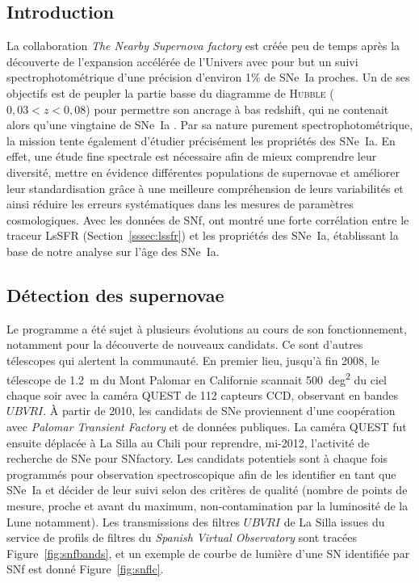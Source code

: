 \documentclass[../main/main.tex]{subfiles}
\begin{document}
\subsection{Introduction}\label{ssec:snfintro}

La collaboration \textit{The Nearby Supernova factory}
\citep[SNfactory,][]{aldering2002} est créée peu de temps après la découverte de
l'expansion accélérée de l'Univers \citep{riess1998, perlmutter1999} avec pour
but un suivi spectrophotométrique d'une précision d'environ 1\% de SNe~Ia
proches. Un de ses objectifs est de peupler la partie basse du diagramme de
\textsc{Hubble} ($0,03 < z < 0,08$) pour permettre son ancrage à bas redshift,
qui ne contenait alors qu'une vingtaine de SNe~Ia \citep{hamuy1996}. Par sa
nature purement spectrophotométrique, la mission tente également d'étudier
précisément les propriétés des SNe~Ia. En effet, une étude fine spectrale est
nécessaire afin de mieux comprendre leur diversité, mettre en évidence
différentes populations de supernovae et améliorer leur standardisation grâce à
une meilleure compréhension de leurs variabilités et ainsi réduire les erreurs
systématiques dans les mesures de paramètres cosmologiques. Avec les données de
SNf, \cite{rigault2020} ont montré une forte corrélation entre le traceur LsSFR
(Section~\ref{sssec:lssfr}) et les propriétés des SNe~Ia, établissant la base de
notre analyse sur l'âge des SNe~Ia.

\subsection{Détection des supernovae}\label{ssec:snfdetec}

Le programme a été sujet à plusieurs évolutions au cours de son fonctionnement,
notamment pour la découverte de nouveaux candidats. Ce sont d'autres télescopes
qui alertent la communauté. En premier lieu, jusqu'à fin 2008, le télescope de
\SI{1,2}{m} du Mont Palomar en Californie \citep{rabinowitz2003} scannait
\SI{500}{deg^2} du ciel chaque soir avec la caméra QUEST de 112 capteurs CCD,
observant en bandes $UBVRI$. À partir de 2010, les candidats de SNe proviennent
d'une coopération avec \textit{Palomar Transient Factory}
\citep[PTF,][]{law2009} et de données publiques. La caméra QUEST fut ensuite
déplacée à La Silla au Chili \citep[LSQ,][]{hadjiyska2012} pour reprendre,
mi-2012, l'activité de recherche de SNe pour SNfactory. Les candidats potentiels
sont à chaque fois programmés pour observation spectroscopique afin de les
identifier en tant que SNe~Ia et décider de leur suivi selon des critères de
qualité (nombre de points de mesure, proche et avant du maximum,
non-contamination par la luminosité de la Lune notamment). Les transmissions des
filtres $UBVRI$ de La Silla issues du service de profils de filtres du
\textit{Spanish Virtual Observatory} \citep[SVO\footnote{
    \href{http://svo2.cab.inta-csic.es/theory/fps/index.php?asttype=astro}
{http://svo2.cab.inta-csic.es/theory/fps/index.php?asttype=astro}},][]
{rodrigo2020} sont tracées Figure~\ref{fig:snfbands}, et un exemple de courbe de
lumière d'une SN identifiée par SNf est donné Figure~\ref{fig:snflc}.
\end{document}
